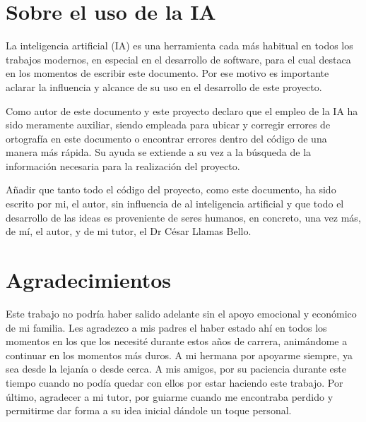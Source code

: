 \section{Sobre el uso de la IA}

La inteligencia artificial (IA) es una herramienta cada más habitual en todos los trabajos modernos, en especial en el desarrollo de software, para el cual destaca en los momentos de escribir este documento. Por ese motivo es importante aclarar la influencia y alcance de su uso en el desarrollo de este proyecto.

Como autor de este documento y este proyecto declaro que el empleo de la IA ha sido meramente auxiliar, siendo empleada para ubicar y corregir errores de ortografía en este documento o encontrar errores dentro del código de una manera más rápida. Su ayuda se extiende a su vez a la búsqueda de la información necesaria para la realización del proyecto.

Añadir que tanto todo el código del proyecto, como este documento, ha sido escrito por mi, el autor, sin influencia de al inteligencia artificial y que todo el desarrollo de las ideas es proveniente de seres humanos, en concreto, una vez más, de mí, el autor, y de mi tutor, el Dr César Llamas Bello.

\section{Agradecimientos}

Este trabajo no podría haber salido adelante sin el apoyo emocional y económico de mi familia. Les agradezco a mis padres el haber estado ahí en todos los momentos en los que los necesité durante estos años de carrera, animándome a continuar en los momentos más duros. A mi hermana por apoyarme siempre, ya sea desde la lejanía o desde cerca. A mis amigos, por su paciencia durante este tiempo cuando no podía quedar con ellos por estar haciendo este trabajo. Por último, agradecer a mi tutor, por guiarme cuando me encontraba perdido y permitirme dar forma a su idea inicial dándole un toque personal.